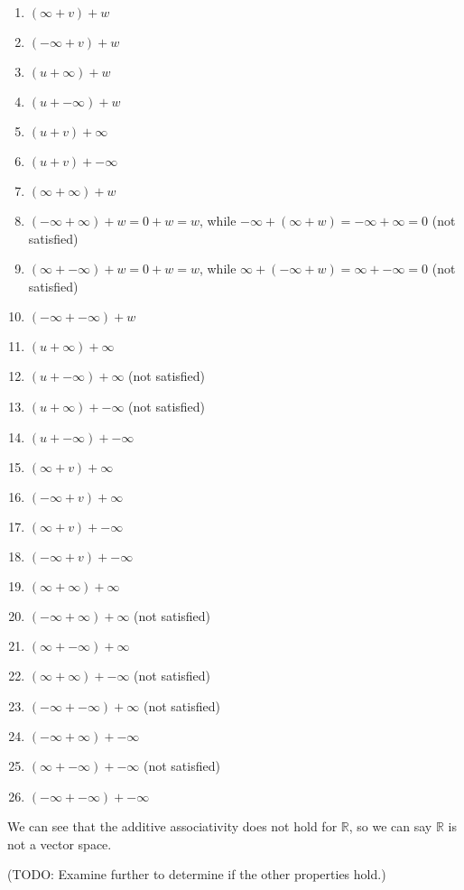 \documentclass[12pt, letterpaper, oneside]{book}
\begin{document}
\begin{enumerate}
  \item $(\infty + v) + w$
  \item $(-\infty + v) + w$
  \item $(u + \infty) + w$
  \item $(u + -\infty) + w$
  \item $(u + v) + \infty$
  \item $(u + v) + -\infty$
  \item $(\infty + \infty) + w$
  \item $(-\infty + \infty) + w = 0 + w = w$, while $-\infty + (\infty + w) =
          -\infty + \infty = 0$ (not satisfied)
  \item $(\infty + -\infty) + w = 0 + w = w$, while $\infty + (-\infty + w) =
          \infty + -\infty = 0$ (not satisfied)
  \item $(-\infty + -\infty) + w$
  \item $(u + \infty) + \infty$
  \item $(u + -\infty) + \infty$ (not satisfied)
  \item $(u + \infty) + -\infty$ (not satisfied)
  \item $(u + -\infty) + -\infty$
  \item $(\infty + v) + \infty$
  \item $(-\infty + v) + \infty$
  \item $(\infty + v) + -\infty$
  \item $(-\infty + v) + -\infty$
  \item $(\infty + \infty) + \infty$
  \item $(-\infty + \infty) + \infty$ (not satisfied)
  \item $(\infty + -\infty) + \infty$
  \item $(\infty + \infty) + -\infty$ (not satisfied)
  \item $(-\infty + -\infty) + \infty$ (not satisfied)
  \item $(-\infty + \infty) + -\infty$
  \item $(\infty + -\infty) + -\infty$ (not satisfied)
  \item $(-\infty + -\infty) + -\infty$
\end{enumerate}

We can see that the additive associativity does not hold for $\mathbb{R}$, so
we can say $\mathbb{R}$ is not a vector space.

(TODO: Examine further to determine if the other properties hold.)
\end{document}
